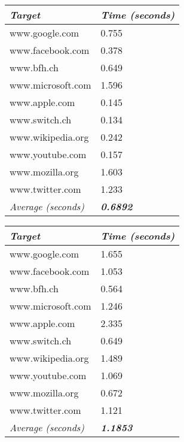 \documentclass[
	a4paper,					10pt,							twoside,					openright,				notitlepage,			parskip=half,			]{scrreprt}
\begin{document}
\\\\\\\\\\
\begin{minipage}[H][5cm][b]{0,5\textwidth}
\centering
\begin{tabular}{l|l}
\textit{\textbf{Target}}   & \textit{\textbf{Time (seconds)}} \\ \hline
www.google.com             & 0.755                            \\
www.facebook.com           & 0.378                            \\
www.bfh.ch                 & 0.649                            \\
www.microsoft.com          & 1.596                            \\
www.apple.com              & 0.145                            \\
www.switch.ch              & 0.134                            \\
www.wikipedia.org          & 0.242                            \\
www.youtube.com            & 0.157                            \\
www.mozilla.org            & 1.603                            \\
www.twitter.com            & 1.233                            \\ \hline
\textit{Average (seconds)} & \textit{\textbf{0.6892}}        
\end{tabular}
 \label{tab:sslCertificateTraceTable} 
\end{minipage}
\begin{minipage}[H][5cm][b]{0,5\textwidth}
\centering
\begin{tabular}{l|l}
\textit{\textbf{Target}}   & \textit{\textbf{Time (seconds)}} \\ \hline
www.google.com             & 1.655                            \\
www.facebook.com           & 1.053                            \\
www.bfh.ch                 & 0.564                            \\
www.microsoft.com          & 1.246                            \\
www.apple.com              & 2.335                            \\
www.switch.ch              & 0.649                            \\
www.wikipedia.org          & 1.489                            \\
www.youtube.com            & 1.069                            \\
www.mozilla.org            & 0.672                            \\
www.twitter.com            & 1.121                            \\ \hline
\textit{Average (seconds)} & \textit{\textbf{1.1853}}        
\end{tabular}
 \label{tab:whoisTraceTable} 
\end{minipage}
\end{document}
